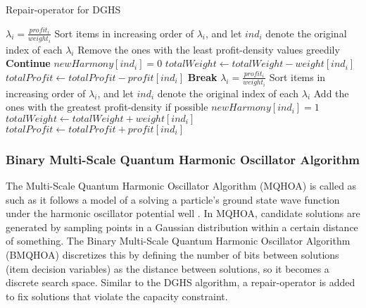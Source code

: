 \documentclass[titlepage]{article}
\begin{document}
\clearpage
\begin{breakablealgorithm}
\caption{Repair-operator for DGHS}\label{harmonyRepair}
    \begin{algorithmic}[1]
             \Comment{\textcolor{blue}{DROP phase}}
                \State $\lambda_{i} = \frac{profit_{i}}{weight_{i}}$
            \EndFor
            \State Sort items in increasing order of $\lambda_{i}$, and let $ind_{i}$ denote the original index of each $\lambda_{i}$
            \State Remove the ones with the least profit-density values greedily
                    \State \textbf{Continue}
                \EndIf
                \State $newHarmony[ind_{i}] = 0$ \Comment{\textcolor{blue}{Unload the item}}
                \State $totalWeight \gets totalWeight - weight[ind_{i}]$
                \State $totalProfit \gets totalProfit - profit[ind_{i}]$
                    \State \textbf{Break} \Comment{\textcolor{blue}{Terminate DROP phase}}
                \EndIf
            \EndFor
        \EndIf
             \Comment{\textcolor{blue}{ADD phase}}
                \State $\lambda_{i} = \frac{profit_{i}}{weight_{i}}$
            \EndFor
            \State Sort items in increasing order of $\lambda_{i}$, and let $ind_{i}$ denote the original index of each $\lambda_{i}$
                \State Add the ones with the greatest profit-density if possible 
                        \State $newHarmony[ind_{i}] = 1$
                        \State $totalWeight \gets totalWeight + weight[ind_{i}]$
                        \State $totalProfit \gets totalProfit + profit[ind_{i}]$
                    \EndIf
                \EndIf
            \EndFor
        \EndIf
    \end{algorithmic}
\end{breakablealgorithm}

\vskip 1cm
\subsubsection{Binary Multi-Scale Quantum Harmonic Oscillator Algorithm}

The Multi-Scale Quantum Harmonic Oscillator Algorithm (MQHOA) is called as such as it follows a model of a solving a particle's ground state wave function under the harmonic oscillator potential well \cite{BMQHOA-article} . In MQHOA, candidate solutions are generated by sampling points in a Gaussian distribution within a certain distance of something. The Binary Multi-Scale Quantum Harmonic Oscillator Algorithm (BMQHOA) discretizes this by defining the number of bits between solutions (item decision variables) as the distance between solutions, so it becomes a discrete search space. Similar to the DGHS algorithm, a repair-operator is added to fix solutions that violate the capacity constraint. 
\end{document}
